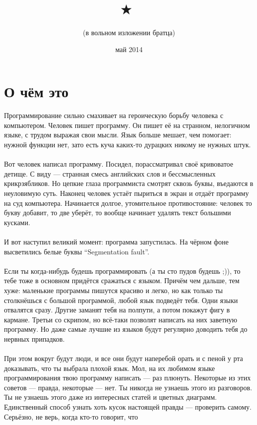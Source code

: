 \documentclass[11pt]{book}
\title{
\small{\textleaf}
\huge{\textleaf}
\huge{\quad \quad}
\small{\textborn} \ 
\small{\APLstar} \ 
\huge{\textborn} \ 
\huge{\APLstar} \ 
\Huge{$\bigstar$} \ 
\huge{\APLstar} \ 
\huge{\textborn} \ 
\small{\APLstar} \ 
\small{\textborn}
\huge{\quad \quad}
\huge{\textleaf}
\small{\textleaf}
}
\author{\Large (в вольном изложении братца) \\ \huge{\Bicycle}}
\date{май 2014}
\begin{document}
\maketitle
\pagebreak

\section*{О чём это}
Программирование сильно смахивает на героическую борьбу человека с компьютером.
Человек пишет программу. Он пишет её на странном, нелогичном языке, с трудом выражая
свои мысли. Язык больше мешает, чем помогает: нужной функции нет, зато есть
куча каких-то дурацких никому не нужных штук.
\\ \\
Вот человек написал программу. Посидел, порассматривал своё кривоватое детище.
С виду --- странная смесь английских слов и бессмысленных крикрзябликов.
Но цепкие глаза программиста смотрят сквозь буквы, въедаются
в неуловимую суть. Наконец человек устаёт пыриться в экран и отдаёт программу
на суд компьютера. Начинается долгое, утомительное противостояние: человек
то букву добавит, то две уберёт, то вообще начинает удалять текст большими кусками.
\\ \\
И вот наступил великий момент: программа запустилась. На чёрном фоне
высветились белые буквы ``Segmentation fault''.
\\ \\
Если ты когда-нибудь будешь программировать (а ты сто пудов будешь ;)), то тебе
тоже в основном придётся сражаться с языком. Причём чем дальше, тем хуже: маленькие
программы пишутся красиво и легко, но как только ты столкнёшься с большой программой,
любой язык подведёт тебя. Одни языки отвалятся сразу. Другие заманят тебя на полпути,
а потом покажут фигу в кармане. Третьи со скрипом, но всё-таки позволят написать на них
заветную программу. Но даже самые лучшие из языков будут регулярно доводить тебя до
нервных припадков.
\\ \\
При этом вокруг будут люди, и все они будут наперебой орать и с пеной у рта
доказывать, что ты выбрала плохой язык. Мол, на их любимом языке программирования
твою программу написать --- раз плюнуть. Некоторые из этих советов --- правда,
некоторые --- нет. Ты никогда не узнаешь этого из разговоров. Ты не узнаешь этого
даже из интересных статей и цветных диаграмм. Единственный способ узнать хоть кусок
настоящей правды --- проверить самому. Серьёзно, не верь, когда кто-то говорит, что
\end{document}
